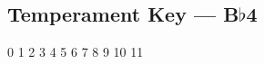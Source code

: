 \subsection{Temperament Key --- B$\flat$4}









































0
1
2
3
4
5
6
7
8
9
10
11
